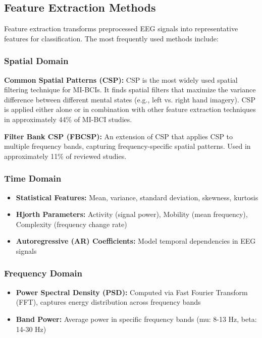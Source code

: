 \documentclass[12pt]{article}
\begin{document}
\subsection{Feature Extraction Methods}

Feature extraction transforms preprocessed EEG signals into representative features for classification. The most frequently used methods include:

\subsubsection{Spatial Domain}

\textbf{Common Spatial Patterns (CSP):} CSP is the most widely used spatial filtering technique for MI-BCIs. It finds spatial filters that maximize the variance difference between different mental states (e.g., left vs. right hand imagery). CSP is applied either alone or in combination with other feature extraction techniques in approximately 44\% of MI-BCI studies.

\textbf{Filter Bank CSP (FBCSP):} An extension of CSP that applies CSP to multiple frequency bands, capturing frequency-specific spatial patterns. Used in approximately 11\% of reviewed studies.

\subsubsection{Time Domain}

\begin{itemize}
    \item \textbf{Statistical Features:} Mean, variance, standard deviation, skewness, kurtosis
    \item \textbf{Hjorth Parameters:} Activity (signal power), Mobility (mean frequency), Complexity (frequency change rate)
    \item \textbf{Autoregressive (AR) Coefficients:} Model temporal dependencies in EEG signals
\end{itemize}

\subsubsection{Frequency Domain}

\begin{itemize}
    \item \textbf{Power Spectral Density (PSD):} Computed via Fast Fourier Transform (FFT), captures energy distribution across frequency bands
    \item \textbf{Band Power:} Average power in specific frequency bands (mu: 8-13 Hz, beta: 14-30 Hz)
\end{itemize}
\end{document}
